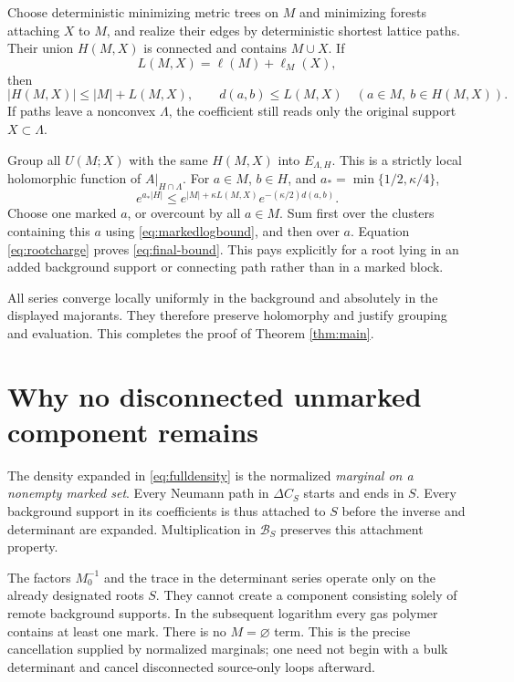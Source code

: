 \documentclass[11pt]{article}
\newcommand{\Bcal}{\mathcal B}
\begin{document}
Choose deterministic minimizing metric trees on $M$ and minimizing
forests attaching $X$ to $M$, and realize their edges by deterministic
shortest lattice paths. Their union $H(M,X)$ is connected and contains
$M\cup X$. If
\[
 L(M,X)=\ell(M)+\ell_M(X),
\]
then
\begin{equation}
 |H(M,X)|\le|M|+L(M,X),\qquad
 d(a,b)\le L(M,X)\quad(a\in M,\ b\in H(M,X)).
 \label{eq:hull}
\end{equation}
If paths leave a nonconvex $\Lambda$, the coefficient still reads
only the original support $X\subset\Lambda$.

Group all $U(M;X)$ with the same $H(M,X)$ into $E_{\Lambda,H}$.
This is a strictly local holomorphic function of $A|_{H\cap\Lambda}$.
For $a\in M$, $b\in H$, and $a_*=\min\{1/2,\kappa/4\}$,
\begin{equation}
 e^{a_*|H|}
 \le e^{|M|+\kappa L(M,X)}e^{-(\kappa/2)d(a,b)}.
 \label{eq:rootcharge}
\end{equation}
Choose one marked $a$, or overcount by all $a\in M$.
Sum first over the clusters containing this $a$ using
\eqref{eq:markedlogbound}, and then over $a$.
Equation \eqref{eq:rootcharge} proves \eqref{eq:final-bound}.
This pays explicitly for a root lying in an added background support
or connecting path rather than in a marked block.

All series converge locally uniformly in the background and absolutely
in the displayed majorants. They therefore preserve holomorphy and
justify grouping and evaluation. This completes the proof
of Theorem \ref{thm:main}.

\section{Why no disconnected unmarked component remains}

The density expanded in \eqref{eq:fulldensity} is the normalized
\emph{marginal on a nonempty marked set}. Every Neumann path in
$\Delta C_S$ starts and ends in $S$.
Every background support in its coefficients is thus attached to $S$
before the inverse and determinant are expanded. Multiplication in
$\Bcal_S$ preserves this attachment property.

The factors $M_0^{-1}$ and the trace in the determinant series operate
only on the already designated roots $S$.
They cannot create a component consisting solely of remote
background supports. In the subsequent logarithm every gas polymer
contains at least one mark. There is no $M=\varnothing$ term.
This is the precise cancellation supplied by normalized marginals;
one need not begin with a bulk determinant and cancel disconnected
source-only loops afterward.
\end{document}
